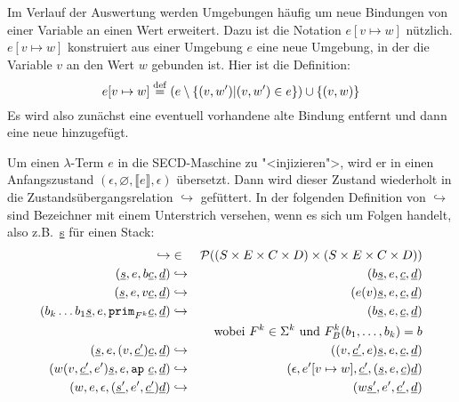 Im Verlauf der Auswertung werden Umgebungen häufig um neue Bindungen
von einer Variable an einen Wert erweitert.  Dazu ist die Notation
$e[v\mapsto w]$ nützlich.  $e[v\mapsto w]$ konstruiert aus einer
Umgebung $e$ eine neue Umgebung, in der die Variable $v$ an den Wert
$w$ gebunden ist.  Hier ist die Definition:
%
\begin{displaymath}
  e[v\mapsto w] \stackrel{\rm def}{=} (e \setminus \{ (v, w') | (v, w') \in e \}) \cup \{
    (v, w) \}
\end{displaymath}
%
Es wird also zunächst eine eventuell vorhandene alte Bindung entfernt
und dann eine neue hinzugefügt.

Um einen $\lambda$-Term $e$ in die SECD-Maschine zu "<injizieren">,
wird er in einen Anfangszustand $(\epsilon, \varnothing, \llbracket
e\rrbracket, \epsilon)$ übersetzt.  Dann wird dieser Zustand
wiederholt in die Zustandsübergangsrelation $\hookrightarrow$
gefüttert.  In der folgenden Definition von $\hookrightarrow$ sind
Bezeichner mit einem Unterstrich versehen, wenn es sich um Folgen
handelt, also z.B.\ \underline{s} für einen Stack:
%
\begin{eqnarray}
  \hookrightarrow &\in& \mathcal{P}((S\times E\times C\times D) \times (S\times E\times C\times D))\notag\\
  (\underline{s}, e, b\underline{c}, \underline{d})
  &\hookrightarrow& 
  (b\underline{s}, e, \underline{c}, \underline{d})
  \label{secd:base}
  \\
  (\underline{s}, e, v\underline{c}, \underline{d})
  &\hookrightarrow&
  (e(v)\underline{s}, e, \underline{c}, \underline{d})
  \label{secd:variable}
  \\
  (b_k\ldots b_1 \underline{s}, e, \mathtt{prim}_{F^k}\underline{c}, \underline{d})
  &\hookrightarrow&
  (b\underline{s}, e, \underline{c}, \underline{d})
  \label{secd:prim}
  \\ && \textrm{wobei $F^k\in\Sigma^k$ und $F^k_B(b_1,\ldots,b_k) = b$}\notag
  \\
  (\underline{s}, e, (v, \underline{c'}) \underline{c}, \underline{d})
  &\hookrightarrow&
  ((v, \underline{c'}, e) \underline{s}, e, \underline{c}, \underline{d})
  \label{secd:abstraction}
  \\
  (w (v,\underline{c'}, e') \underline{s}, e, \mathtt{ap}~\underline{c}, \underline{d})
  &\hookrightarrow&
  (\epsilon, e'[v\mapsto w], \underline{c'}, (\underline{s}, e, \underline{c}) \underline{d})
  \label{secd:app}
  \\
  (w, e, \epsilon, (\underline{s'}, e', \underline{c'}) \underline{d})
  &\hookrightarrow&
  (w\underline{s'}, e', \underline{c'}, \underline{d})
  \label{secd:return}
\end{eqnarray}
